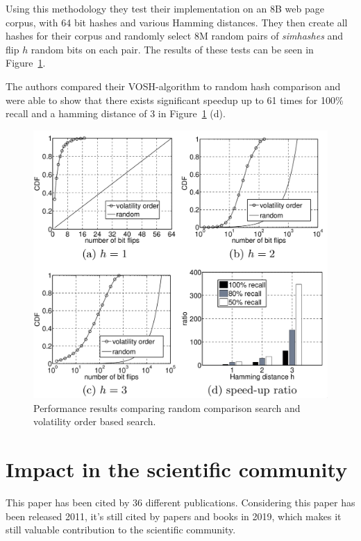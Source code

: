 \documentclass[12pt,a4paper,DIV=calc]{scrartcl}
\begin{document}
Using this methodology they test their implementation on an 8B web page corpus, with 64 bit hashes and various Hamming distances.
They then create all hashes for their corpus and randomly select 8M random pairs of \emph{simhashes} and flip $h$ random bits on each pair.
The results of these tests can be seen in Figure~\ref{fig:vosh-performance}.

The authors compared their VOSH-algorithm to random hash comparison and were able to show that there exists significant speedup up to 61 times for 100\% recall and a hamming distance of 3 in Figure~\ref{fig:vosh-performance} (d).

\begin{figure}[H]
    \includegraphics[scale=0.35]{./gfx/vosh-performance.png}
    \centering
    \caption{Performance results comparing random comparison search and volatility order based search.}\label{fig:vosh-performance}
\end{figure}


\section{Impact in the scientific community}
This paper has been cited by 36 different publications.
Considering this paper has been released 2011, it's still cited by papers and books in 2019, which makes it still valuable contribution to the scientific community.
\end{document}
